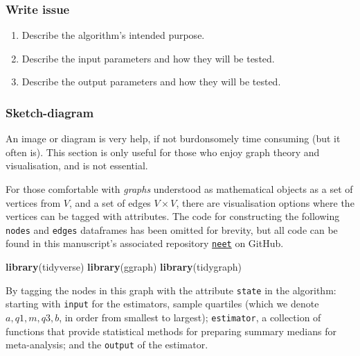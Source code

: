 \documentclass[
]{article}
\newenvironment{Shaded}{\begin{snugshade}}{\end{snugshade}}
\newcommand{\KeywordTok}[1]{\textcolor[rgb]{0.13,0.29,0.53}{\textbf{#1}}}
\newcommand{\NormalTok}[1]{#1}
\providecommand{\tightlist}{%
  \setlength{\itemsep}{0pt}\setlength{\parskip}{0pt}}
\begin{document}
\hypertarget{write-issue}{%
\subsubsection{Write issue}\label{write-issue}}

\begin{enumerate}
\def\labelenumi{\arabic{enumi}.}
\tightlist
\item
  Describe the algorithm's intended purpose.
\item
  Describe the input parameters and how they will be tested.
\item
  Describe the output parameters and how they will be tested.
\end{enumerate}

\hypertarget{sketch-diagram}{%
\subsubsection{Sketch-diagram}\label{sketch-diagram}}

An image or diagram is very help, if not burdonsomely time consuming
(but it often is). This section is only useful for those who enjoy graph
theory and visualisation, and is not essential.

For those comfortable with \emph{graphs} understood as mathematical
objects as a set of vertices from \(V\), and a set of edges
\(V \times V\), there are visualisation options where the vertices can
be tagged with attributes. The code for constructing the following
\texttt{nodes} and \texttt{edges} dataframes has been omitted for
brevity, but all code can be found in this manuscript's associated
repository \href{https://github.com/softloud/neet}{\texttt{neet}} on
GitHub.

\begin{Shaded}
\begin{Highlighting}[]
\KeywordTok{library}\NormalTok{(tidyverse)}
\KeywordTok{library}\NormalTok{(ggraph)}
\KeywordTok{library}\NormalTok{(tidygraph)}
\end{Highlighting}
\end{Shaded}

By tagging the nodes in this graph with the attribute \texttt{state} in
the algorithm: starting with \texttt{input} for the estimators, sample
quartiles (which we denote \(a, q1, m, q3, b\), in order from smallest
to largest); \texttt{estimator}, a collection of functions that provide
statistical methods for preparing summary medians for meta-analysis; and
the \texttt{output} of the estimator.
\end{document}
